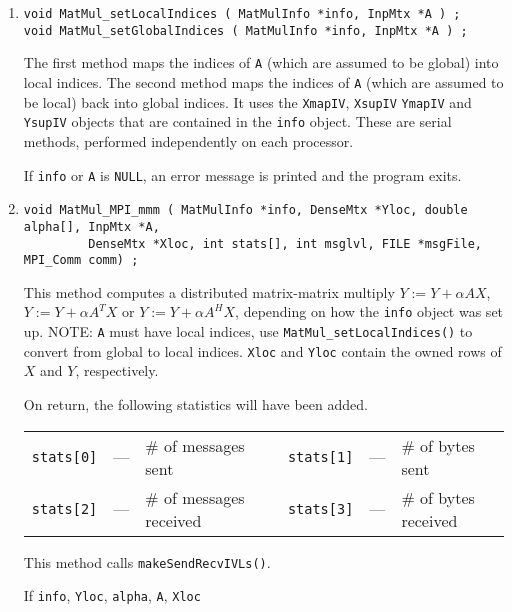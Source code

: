 \begin{enumerate}
\item
\begin{verbatim}
void MatMul_setLocalIndices ( MatMulInfo *info, InpMtx *A ) ;
void MatMul_setGlobalIndices ( MatMulInfo *info, InpMtx *A ) ;
\end{verbatim}
The first method maps the indices of {\tt A} (which are assumed to be
global) into local indices.
The second method maps the indices of {\tt A} (which are assumed to be
local) back into global indices.
It uses the {\tt XmapIV}, {\tt XsupIV}
{\tt YmapIV} and {\tt YsupIV} objects that are contained in the
{\tt info} object.
These are serial methods, performed independently on each
processor.
\par {}
If {\tt info} or {\tt A} is {\tt NULL}, 
an error message is printed and the program exits.
\item
\begin{verbatim}
void MatMul_MPI_mmm ( MatMulInfo *info, DenseMtx *Yloc, double alpha[], InpMtx *A, 
         DenseMtx *Xloc, int stats[], int msglvl, FILE *msgFile, MPI_Comm comm) ;
\end{verbatim}
This method computes a distributed matrix-matrix multiply
$Y := Y + \alpha A X$,
$Y := Y + \alpha A^T X$ or
$Y := Y + \alpha A^H X$,
depending on how the {\tt info} object was set up.
NOTE: {\tt A} must have local indices, use
{\tt MatMul\_setLocalIndices()} to convert from global to local indices.
{\tt Xloc} and {\tt Yloc} contain the owned rows of $X$ and $Y$,
respectively.
\par
On return, the following statistics will have been added.
\begin{center}
\begin{tabular}{cclcccl}
{\tt stats[0]} & --- & \# of messages sent 
& &
{\tt stats[1]} & --- & \# of bytes sent \\
{\tt stats[2]} & --- & \# of messages received 
& &
{\tt stats[3]} & --- & \# of bytes received 
\end{tabular}
\end{center}
This method calls {\tt makeSendRecvIVLs()}.
\par {}
If {\tt info}, {\tt Yloc}, {\tt alpha}, {\tt A}, {\tt Xloc}

\end{enumerate}
